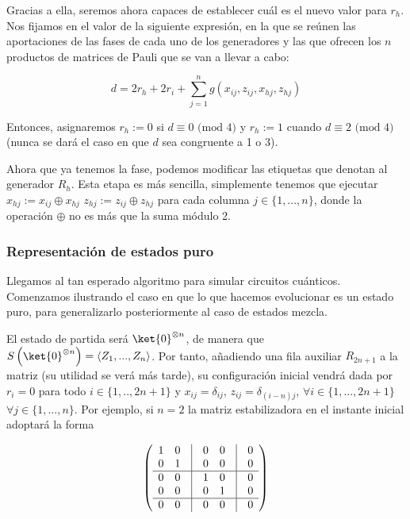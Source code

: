 \documentclass[11pt,a4paper,twoside,pdf]{article}
\numberwithin{equation}{section}
\begin{document}
			Gracias a ella, seremos ahora capaces de establecer cuál es el nuevo valor para $r_h$. Nos fijamos en el valor de la siguiente expresión, en la que se reúnen las aportaciones de las fases de cada uno de los generadores y las que ofrecen los $n$ productos de matrices de Pauli que se van a llevar a cabo: 
		
				\begin{equation*}
					d = 2r_h + 2r_i + \displaystyle\sum_{j=1}^n g(x_{ij},z_{ij},x_{hj},z_{hj})
				\end{equation*}
		
			Entonces, asignaremos $r_h:=0$ si $d \equiv 0 \text{ (mod 4)}$ y $r_h:=1$ cuando $d \equiv 2 \text{ (mod 4)}$ (nunca se dará el caso en que $d$ sea congruente a 1 o 3).
		
			Ahora que ya tenemos la fase, podemos modificar las etiquetas que denotan al generador $R_h$. Esta etapa es más sencilla, simplemente tenemos que ejecutar $x_{hj} := x_{ij} \oplus x_{hj}$ $z_{hj} := z_{ij} \oplus z_{hj}$ para cada columna $j\in\{1,...,n\}$, donde la operación $\oplus$ no es más que la suma módulo 2.
			
			
		\subsubsection{Representación de estados puro}
		
		Llegamos al tan esperado algoritmo para simular circuitos cuánticos. Comenzamos ilustrando el caso en que lo que hacemos evolucionar es un estado puro, para generalizarlo posteriormente al caso de estados mezcla.
		
		El estado de partida será $\ket{0}^{\otimes n}$, de manera que $S \left( \ket{0}^{\otimes n} \right) = \left\langle Z_1,...,Z_n \right\rangle $. Por tanto, añadiendo una fila auxiliar $R_{2n+1}$ a la matriz (su utilidad se verá más tarde), su configuración inicial vendrá dada por $r_i=0$ para todo $i \in \{1,..,2n+1\}$ y $x_{ij}=\delta_{ij}$, $z_{ij}=\delta_{(i-n)j}$, $\forall i\in\{1,...,2n+1\}$ $\forall j \in \{1,...,n\}$. Por ejemplo, si $n=2$ la matriz estabilizadora en el instante inicial adoptará la forma
			
			\begin{equation*}
				\left( 
					\begin{array}{ccccccc}
						1 & 0 & \vline & 0 & 0 & \vline & 0 \\
						0 & 1 & \vline & 0 & 0 & \vline & 0	\\ 		\hline
						0 & 0 & \vline & 1 & 0 & \vline & 0 \\
						0 & 0 & \vline & 0 & 1 & \vline & 0	\\		\hline
						0 & 0 & \vline & 0 & 0 & \vline & 0
					\end{array}
				\right) 
			\end{equation*}
		
\end{document}
